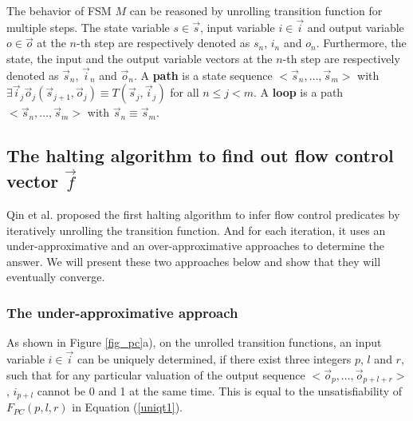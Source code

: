 \documentclass[runningheads,a4paper,orivec]{llncs}
\begin{document}
The behavior of FSM $M$ can be reasoned by unrolling transition function for multiple steps.
The state variable $s\in\vec{s}$, input variable $i\in\vec{i}$ and output variable $o\in\vec{o}$ at the $n$-th step 
are respectively denoted as $s_n$, $i_n$ and $o_n$.
Furthermore,
the state, the input and the output variable vectors at the $n$-th step are respectively denoted as $\vec{s}_n$, $\vec{i}_n$ and $\vec{o}_n$.
A \textbf{path} is a state sequence $<\vec{s}_n,\dots,\vec{s}_m>$ with $\exists \vec{i}_j\vec{o}_j (\vec{s}_{j+1},\vec{o}_j)\equiv T(\vec{s}_j,\vec{i}_j)$ for all $n\le j< m$.
A \textbf{loop} is a path $<\vec{s}_n,\dots,\vec{s}_m>$ with $\vec{s}_n\equiv \vec{s}_m$.



\subsection{The halting algorithm to find out flow control vector $\vec{f}$}\label{subsec_chkextdec}


Qin et al. \cite{QinTODAES15} proposed the first halting algorithm
to infer flow control predicates by iteratively unrolling the transition function.
And for each iteration,
it uses an under-approximative and an over-approximative approaches to determine the answer.
We will present these two approaches below and show 
that they will eventually converge.

\subsubsection{The under-approximative approach}\label{subsub_sound}
As shown in Figure \ref{fig_pc}a),
on the unrolled transition functions,
an input variable $i\in\vec{i}$ can be uniquely determined,
if there exist three integers $p$, $l$ and $r$,
such that for any particular valuation of the output sequence $<\vec{o}_p,\dots,\vec{o}_{p+l+r}>$,
$i_{p+l}$ cannot be 0 and 1 at the same time.
This is equal to the unsatisfiability of $F_{PC}(p,l,r)$ in Equation (\ref{uniqt1}).
\end{document}
